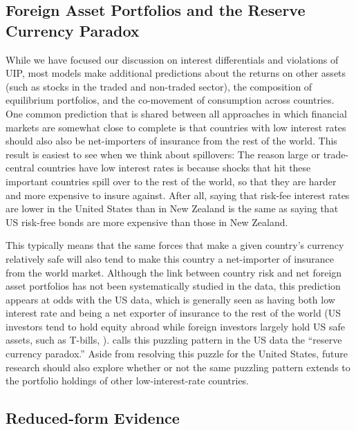 \documentclass{ar-1col}
\begin{document}
\begin{textbox}[h]
\section{Foreign Asset Portfolios and the Reserve Currency Paradox} While we have focused our discussion on interest differentials and violations of UIP, most models make additional predictions about the returns on other assets (such as stocks in the traded and non-traded sector), the composition of equilibrium portfolios, and the co-movement of consumption across countries. One common prediction that is shared between all approaches in which financial markets are somewhat close to complete is that countries with low interest rates should also also be net-importers of insurance from the rest of the world. This result is easiest to see when we think about spillovers: The reason large or trade-central countries have low interest rates is because shocks that hit these important countries spill over to the rest of the world, so that they are harder and more expensive to insure against. After all, saying that risk-fee interest rates are lower in the United States than in New Zealand is the same as saying that US risk-free bonds are more expensive than those in New Zealand.

This typically means that the same forces that make a given country's currency relatively safe will also tend to make this country a net-importer of insurance from the world market. Although the link between country risk and net foreign asset portfolios has not been systematically studied in the data, this prediction appears at odds with the US data, which is generally seen as having both low interest rate and being a net exporter of insurance to the rest of the world (US investors tend to hold equity abroad while foreign investors largely hold US safe assets, such as T-bills, \citep{GourinchasRey2007,GourinchasGovillotRey2017}). \cite{Maggiori2013} calls this puzzling pattern in the US data the ``reserve currency paradox.'' Aside from resolving this puzzle for the United States, future research should also explore whether or not the same puzzling pattern extends to the portfolio holdings of other low-interest-rate countries. 

\end{textbox}






\subsection{Reduced-form Evidence}
\end{document}
